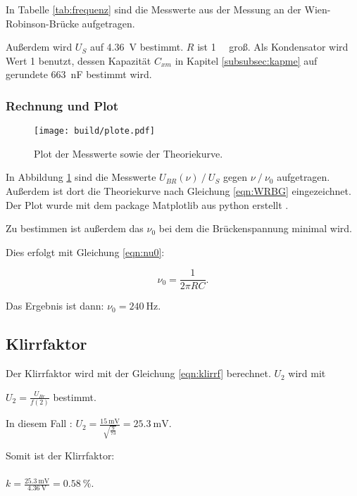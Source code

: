 In Tabelle \ref{tab:frequenz} sind die Messwerte aus der Messung an der
Wien-Robinson-Brücke aufgetragen.

Außerdem wird $U_S$ auf \SI{4.36}{\volt} bestimmt. $R$ ist \SI{1}{\kilo\Omega}
groß. Als Kondensator wird Wert 1 benutzt, dessen Kapazität $C_{xm}$ in Kapitel
\ref{subsubsec:kapme} auf gerundete \SI{663}{\nano\farad} bestimmt wird.

\FloatBarrier

\subsubsection{Rechnung und Plot}

\begin{figure}[h]
  \centering
  \texttt{[image: build/plote.pdf]}
  \caption{Plot der Messwerte sowie der Theoriekurve.}
  \label{fig:WRBplot}
\end{figure}

In Abbildung \ref{fig:WRBplot} sind die Messwerte $U_{BR}(\nu) \ /\ U_S$ gegen
$\nu \ /\ \nu_0$ aufgetragen. Außerdem ist dort die Theoriekurve nach Gleichung
\eqref{eqn:WRBG} eingezeichnet. Der Plot wurde mit dem package Matplotlib aus
python erstellt \cite{matplotlib}.

Zu bestimmen ist außerdem das $\nu_0$ bei dem die Brückenspannung minimal wird.

Dies erfolgt mit Gleichung \eqref{eqn:nu0}:

\begin{equation}
  \nu_0 = \frac{1}{2 \pi R C}.
  \label{eqn:nu0}
\end{equation}

Das Ergebnis ist dann: $\nu_0 = \SI{240}{\hertz}$.

\subsection{Klirrfaktor}

Der Klirrfaktor wird mit der Gleichung \eqref{eqn:klirrf} berechnet.
$U_2$ wird mit

$U_2 = \frac{U_{Br}}{f(2)}$ bestimmt.

In diesem Fall : $U_2 = \frac{\SI{15}{\milli\volt}}{\sqrt{\frac{9}{73}}} =
\SI{25.3}{\milli\volt}$.

Somit ist der Klirrfaktor:\\
\\$k = \frac{\SI{25.3}{\milli\volt}}{\SI{4.36}{\volt}} = \SI{0.58}{\percent}$.
